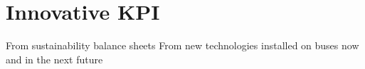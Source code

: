 \chapter{Innovative KPI}

From sustainability balance sheets
From new technologies installed on buses now and in the next future

